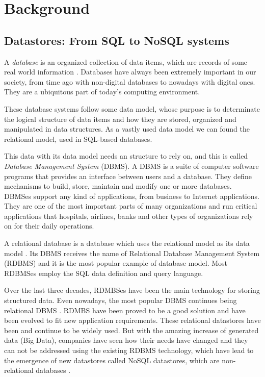 \chapter{Background}
\label{chapter:background} 


\section{Datastores:  From SQL to NoSQL systems}

A \textit{database} is an organized collection of data items, which are records of some real world information \cite{gray1993transaction}. Databases have always been extremely important in our society, from time ago with non-digital databases to nowadays with digital ones. They are a ubiquitous part of today's computing environment. 
\par
These database systems follow some data model, whose purpose is to determinate the logical structure of data items and how they are stored, organized and manipulated in data structures. As a vastly used data model we can found the relational model, used in SQL-based databases. 
\par
This data with its data model needs an structure to rely on, and this is called \textit{Database Management System} (DBMS). A DBMS is a suite of computer software programs that provides an interface between users and a database. They define mechanisms to build, store, maintain and modify one or more databases. 
DBMSes support any kind of applications, from business to Internet applications. They are one of the most important parts of many organizations and run critical applications that hospitals, airlines, banks and other types of organizations rely on for their daily operations.
\par
A relational database is a database which uses the relational model as its data model \cite{codd2001relational}. Its DBMS receives the name of Relational Database Management System (RDBMS) and it is the most popular example of database model. Most RDBMSes employ the SQL data definition and query language.
\par
Over the last three decades, RDMBSes have been the main technology for storing structured data. Even nowadays, the most popular DBMS continues being relational DBMS \cite{DBEnginesRanking}. RDMBS have been proved to be a good solution and have been evolved to fit new application requirements. These relational datastores have been and continue to be widely used. But with the amazing increase of generated data (Big Data), companies have seen how their needs have changed and they can not be addressed using the existing RDBMS technology, which have lead to the emergence of new datastores called NoSQL datastores, which are non-relational databases \cite{strauch2011nosql}.

